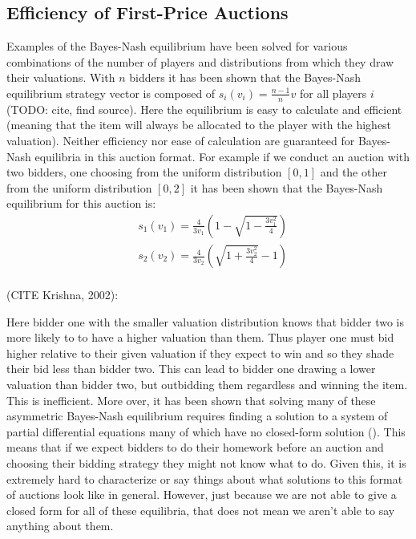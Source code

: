 \documentclass[12pt,twoside]{reedthesis}
\begin{document}
\subsection{Efficiency of First-Price Auctions}
Examples of the Bayes-Nash equilibrium have been solved for various combinations of the number of players and distributions from which they draw their valuations. With $n$ bidders it has been shown that the Bayes-Nash equilibrium strategy vector is composed of $s_i(v_i) = \frac{n-1}{n} v$ for all players $i$ (TODO: cite, find source). Here the equilibrium is easy to calculate and efficient (meaning that the item will always be allocated to the player with the highest valuation). Neither efficiency nor ease of calculation are guaranteed for Bayes-Nash equilibria in this auction format. For example if we conduct an auction with two bidders, one choosing from the uniform distribution $[0,1]$ and the other from the uniform distribution $[0,2]$ it has been shown that the Bayes-Nash equilibrium for this auction is:
\begin{align*}
	&s_1(v_1) = \frac{4}{3 v_1} \left(1 - \sqrt{1 - \frac{3v_1^2}{4}}\right)\\
	&s_2(v_2) = \frac{4}{3 v_2} \left(\sqrt{1 + \frac{3v_2^2}{4}} - 1 \right)\\
\end{align*}
 
(CITE Krishna, 2002):

Here bidder one with the smaller valuation distribution knows that bidder two is more likely to to have a higher valuation than them. Thus player one must bid higher relative to their given valuation if they expect to win and so they shade their bid less than bidder two. This can lead to bidder one drawing a lower valuation than bidder two, but outbidding them regardless and winning the item. This is inefficient. More over, it has been shown that solving many of these asymmetric Bayes-Nash equilibrium requires finding a solution to a system of partial differential equations many of which have no closed-form solution (\cite{Roughgarden2017}). This means that if we expect bidders to do their homework before an auction and choosing their bidding strategy they might not know what to do. Given this, it is extremely hard to characterize or say things about what solutions to this format of auctions look like in general. However, just because we are not able to give a closed form for all of these equilibria, that does not mean we aren't able to say anything about them. 
\end{document}
